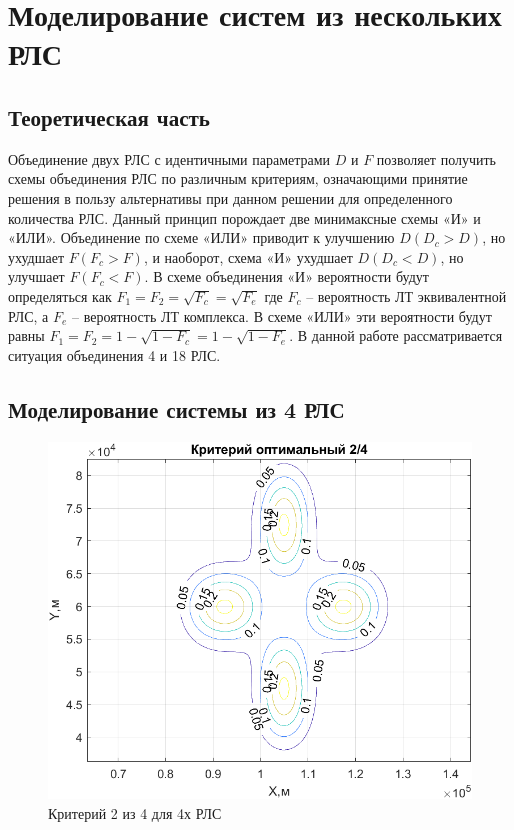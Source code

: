 \chapter{Моделирование систем из нескольких РЛС}

\section{Теоретическая часть}

Объединение двух РЛС с идентичными параметрами $D$ и $F$ позволяет получить схемы объединения РЛС по различным критериям, означающими принятие решения в пользу альтернативы при данном решении для определенного количества РЛС. Данный принцип порождает две минимаксные схемы «И» и «ИЛИ». Объединение по схеме «ИЛИ» приводит к улучшению $D(D_c > D)$, но ухудшает $F(F_c > F)$, и наоборот, схема «И» ухудшает $D(D_c < D)$, но улучшает $F(F_c < F)$. В схеме объединения «И» вероятности будут определяться как $F_1 = F_2 = \sqrt{F_c} = \sqrt{F_e}$ где $F_c$ – вероятность ЛТ эквивалентной РЛС, а $F_e$ – вероятность ЛТ комплекса.
В схеме «ИЛИ» эти вероятности будут равны $F_1 = F_2 = 1 - \sqrt{1 - F_c} = 1 - \sqrt{1 - F_e}.$
В данной работе рассматривается ситуация объединения 4 и 18 РЛС. 

\section{Моделирование системы из 4 РЛС}

\begin{figure}
    \centering
    \includegraphics{figures/2_4_RLS.png}
    \caption{Критерий 2 из 4 для 4х РЛС}
    \label{fig:my_label}
\end{figure}

